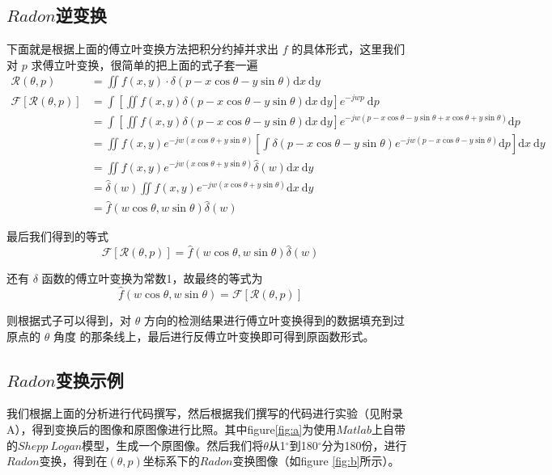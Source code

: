 \documentclass[hyperref]{ctexart}
\begin{document}
		\subsection{$Radon$逆变换}
			下面就是根据上面的傅立叶变换方法把积分约掉并求出 $f$ 的具体形式，这里我们对 $p$ 求傅立叶变换，很简单的把上面的式子套一遍
			\begin{equation}
				\begin{aligned}
				\mathcal{R}(\theta, p) &=\iint f(x, y) \cdot \delta(p-x \cos \theta-y \sin \theta) \mathrm{d} x \mathrm{~d} y \\
				\mathcal{F}[\mathcal{R}(\theta, p)] &=\int\left[\iint f(x, y) \delta(p-x \cos \theta-y \sin \theta) \mathrm{d} x \mathrm{~d} y\right] e^{-j w p} \mathrm{~d} p \\
				&=\int\left[\iint f(x, y) \delta(p-x \cos \theta-y \sin \theta) \mathrm{d} x \mathrm{~d} y\right] e^{-j w(p-x \cos \theta-y \sin \theta+x \cos \theta+y \sin \theta)} \mathrm{d} p \\
				&=\iint f(x, y) e^{-j w(x \cos \theta+y \sin \theta)}\left[\int \delta(p-x \cos \theta-y \sin \theta) e^{-j w(p-x \cos \theta-y \sin \theta)} \mathrm{d} p\right] \mathrm{d} x \mathrm{~d} y \\
				&=\iint f(x, y) e^{-j w(x \cos \theta+y \sin \theta)} \hat{\delta}(w) \mathrm{d} x \mathrm{~d} y \\
				&=\hat{\delta}(w) \iint f(x, y) e^{-j w(x \cos \theta+y \sin \theta)} \mathrm{d} x \mathrm{~d} y \\
				&=\hat{f}(w \cos \theta, w \sin \theta) \hat{\delta}(w)
				\end{aligned}
			\end{equation}

			最后我们得到的等式
			\begin{equation}
				\mathcal{F}[\mathcal{R}(\theta, p)]=\hat{f}(w \cos \theta, w \sin \theta) \hat{\delta}(w)
			\end{equation}

			还有 $\delta$ 函数的傅立叶变换为常数1，故最终的等式为
			\begin{equation}
				\hat{f}(w \cos \theta, w \sin \theta)=\mathcal{F}[\mathcal{R}(\theta, p)]
			\end{equation}

			则根据式子可以得到，对 $\theta$ 方向的检测结果进行傅立叶变换得到的数据填充到过原点的 $\theta$ 角度 的那条线上，最后进行反傅立叶变换即可得到原函数形式。

		\subsection{$Radon$变换示例}
			我们根据上面的分析进行代码撰写，然后根据我们撰写的代码进行实验（见附录A），得到变换后的图像和原图像进行比照。其中figure\ref{fig:a}为使用$Matlab$上自带的$Shepp\ Logan$模型，生成一个原图像。然后我们将$\theta$从1$^{\circ}$到180$^{\circ}$分为180份，进行$Radon$变换，得到在$(\theta,p)$坐标系下的$Radon$变换图像（如figure \ref{fig:b}所示）。
\end{document}
